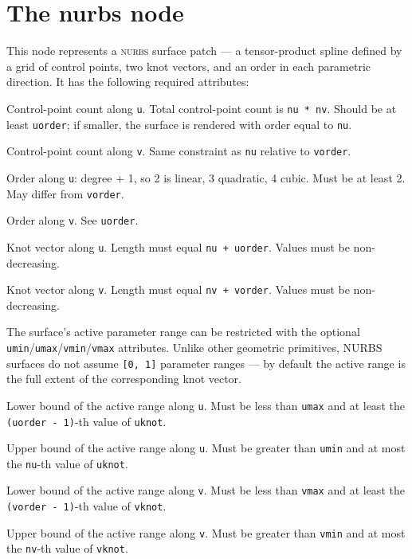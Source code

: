 \documentclass[oneside,ebook]{memoir}
\newcommand*{\acronym}[1]{\textsc{\lowercase{#1}}}
\newcommand{\paramlistitemTN}[2]{\item[#2\textcolor{lightgray}{\dotfill}#1]}
\begin{document}
\section{The nurbs node}
\label{section:nurbsnode}
This node represents a \acronym{NURBS} surface patch --- a tensor-product spline defined by a grid of control points, two knot vectors, and an order in each parametric direction. It has the following required attributes:
\begin{paramlist}
\paramlistitemTN{int}{nu}
Control-point count along \lstinline|u|. Total control-point count is \lstinline|nu * nv|. Should be at least \lstinline|uorder|; if smaller, the surface is rendered with order equal to \lstinline|nu|.
\paramlistitemTN{int}{nv}
Control-point count along \lstinline|v|. Same constraint as \lstinline|nu| relative to \lstinline|vorder|.
\paramlistitemTN{int}{uorder}
Order along \lstinline|u|: degree + 1, so 2 is linear, 3 quadratic, 4 cubic. Must be at least 2. May differ from \lstinline|vorder|.
\paramlistitemTN{int}{vorder}
Order along \lstinline|v|. See \lstinline|uorder|.
\paramlistitemTN{float}{uknot}
Knot vector along \lstinline|u|. Length must equal \lstinline|nu + uorder|. Values must be non-decreasing.
\paramlistitemTN{float}{vknot}
Knot vector along \lstinline|v|. Length must equal \lstinline|nv + vorder|. Values must be non-decreasing.
\end{paramlist}

The surface's active parameter range can be restricted with the optional \lstinline|umin|/\lstinline|umax|/\lstinline|vmin|/\lstinline|vmax| attributes. Unlike other geometric primitives, NURBS surfaces do not assume \lstinline|[0, 1]| parameter ranges --- by default the active range is the full extent of the corresponding knot vector.

\begin{paramlist}
\paramlistitemTN{float}{umin}
Lower bound of the active range along \lstinline|u|. Must be less than \lstinline|umax| and at least the \lstinline|(uorder - 1)|-th value of \lstinline|uknot|.
\paramlistitemTN{float}{umax}
Upper bound of the active range along \lstinline|u|. Must be greater than \lstinline|umin| and at most the \lstinline|nu|-th value of \lstinline|uknot|.
\paramlistitemTN{float}{vmin}
Lower bound of the active range along \lstinline|v|. Must be less than \lstinline|vmax| and at least the \lstinline|(vorder - 1)|-th value of \lstinline|vknot|.
\paramlistitemTN{float}{vmax}
Upper bound of the active range along \lstinline|v|. Must be greater than \lstinline|vmin| and at most the \lstinline|nv|-th value of \lstinline|vknot|.
\end{paramlist}
\end{document}
